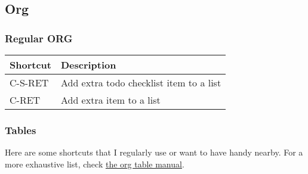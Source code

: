 \documentclass[11pt]{article}
\begin{document}
\subsection{Org}
\label{sec:orgb94df9f}
\subsubsection{Regular ORG}
\label{sec:org925cf8e}
\begin{center}
\begin{tabular}{ll}
Shortcut & Description\\
\hline
C-S-RET & Add extra todo checklist item to a list\\
C-RET & Add extra item to a list\\
\hline
\end{tabular}
\end{center}
\subsubsection{Tables}
\label{sec:orgc4491a8}
Here are some shortcuts that I regularly use or want to have handy nearby. For a more exhaustive list, check \href{https://orgmode.org/manual/Built\_002din-Table-Editor.html\#Built\_002din-Table-Editor}{the org table manual}.
\end{document}
